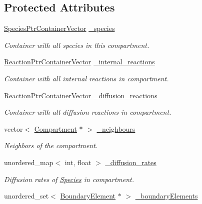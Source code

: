 \subsection*{Protected Attributes}
\begin{DoxyCompactItemize}
\item 
\hyperlink{classSpeciesPtrContainerVector}{Species\+Ptr\+Container\+Vector} \hyperlink{classCompartment_a95e7acd5a3b639050b25fb3b84a96689}{\+\_\+species}
\begin{DoxyCompactList}\small\item\em Container with all species in this compartment. \end{DoxyCompactList}\item 
\hyperlink{classReactionPtrContainerVector}{Reaction\+Ptr\+Container\+Vector} \hyperlink{classCompartment_a76ec81e3474bacae837cce0081a03039}{\+\_\+internal\+\_\+reactions}
\begin{DoxyCompactList}\small\item\em Container with all internal reactions in compartment. \end{DoxyCompactList}\item 
\hyperlink{classReactionPtrContainerVector}{Reaction\+Ptr\+Container\+Vector} \hyperlink{classCompartment_a65651faf3e83b092235afdba261cf820}{\+\_\+diffusion\+\_\+reactions}
\begin{DoxyCompactList}\small\item\em Container with all diffusion reactions in compartment. \end{DoxyCompactList}\item 
vector$<$ \hyperlink{classCompartment}{Compartment} $\ast$ $>$ \hyperlink{classCompartment_aef4d7ce0676c4ddb03fa02b90973c41c}{\+\_\+neighbours}
\begin{DoxyCompactList}\small\item\em Neighbors of the compartment. \end{DoxyCompactList}\item 
unordered\+\_\+map$<$ int, float $>$ \hyperlink{classCompartment_a92081814841d9bacca088eb55381f89c}{\+\_\+diffusion\+\_\+rates}
\begin{DoxyCompactList}\small\item\em Diffusion rates of \hyperlink{classSpecies}{Species} in compartment. \end{DoxyCompactList}\item 
unordered\+\_\+set$<$ \hyperlink{classBoundaryElement}{Boundary\+Element} $\ast$ $>$ \hyperlink{classCompartment_aa582b3db6d4bef92ec7c7b7e639d0a09}{\+\_\+boundary\+Elements}

\end{DoxyCompactItemize}

